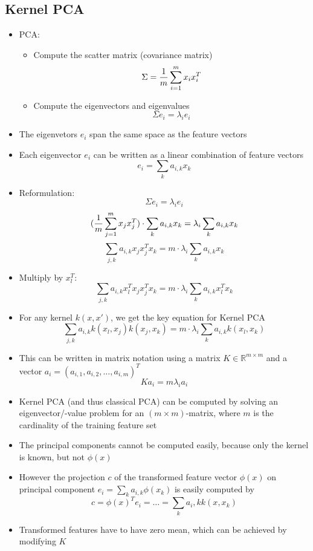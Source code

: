 \subsection*{Kernel PCA}
\begin{itemize}
    \item
        PCA:
        \begin{itemize}
            \item 
                Compute the scatter matrix (covariance matrix)
                $$\Sigma = \frac{\displaystyle 1}{\displaystyle m} \sum_{i=1}^{m} x_i x_i^T$$
            \item
                Compute the eigenvectors and eigenvalues
                $$\Sigma e_i = \lambda_i e_i$$
        \end{itemize}
    \item
        The eigenvetors $e_i$ span the same space as the feature vectors
    \item
        Each eigenvector $e_i$ can be written as a linear combination of feature vectors
        $$e_i = \sum_{k} a_{i,k} x_k$$
    \item
        Reformulation:
        $$ \Sigma e_i = \lambda_i e_i$$
        $$ (\frac{\displaystyle 1}{\displaystyle m} \sum_{j=1}^{m} x_j x_j^T)\cdot \sum_k a_{i,k} x_k = \lambda_i \sum_k a_{i,k}x_k$$
        $$ \sum_{j,k} a_{i,k} x_j x_j^T x_k = m \cdot \lambda_i \sum_k a_{i,k} x_k$$
    \item
        Multiply by $x_l^T$:
        $$ \sum_{j,k} a_{i,k} x_l^T x_j x_j^T x_k = m \cdot \lambda_i \sum_k a_{i,k} x_l^T x_k$$
    \item
        For any kernel $k(x,x')$, we get the key equation for Kernel PCA
        $$ \sum_{j,k} a_{i,k} k(x_l,x_j) k(x_j,x_k) = m \cdot \lambda_i \sum_k a_{i,k} k(x_l,x_k)$$
    \item
        This can be written in matrix notation using a matrix $K \in \mathbb{R}^{m\times m}$ and a vector $a_i = (a_{i,1}, a_{i,2} , \dots, a_{i,m})^T$
        $$K a_i = m \lambda_i a_i$$
    \item
        Kernel PCA (and thus classical PCA) can be computed by solving an eigenvector/-value problem for an $(m \times m)$-matrix, where $m$ is the cardinality of the training feature set
    \item
        The principal components cannot be computed easily, because only the kernel is known, but not $\phi(x)$
    \item
        However the projection $c$ of the transformed feature vector $\phi(x)$ on principal component $e_i = \sum_k a_{i,k} \phi(x_k)$ is easily computed by
        $$c = \phi(x)^T e_i = \dots = \sum_k a_i,k k(x,x_k)$$
    \item
        Transformed features have to have zero mean, which can be achieved by modifying $K$
\end{itemize}

